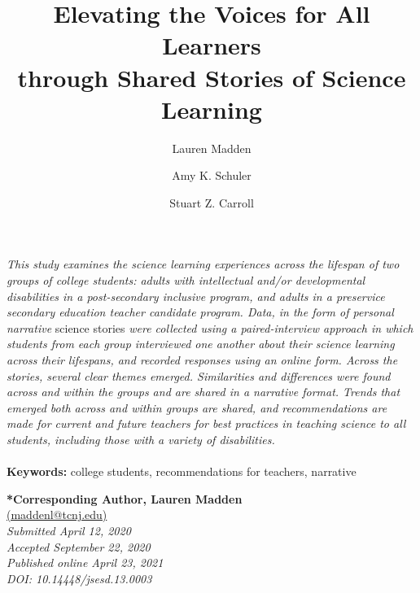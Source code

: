 \documentclass[11pt]{sig-alternate}
\makeatletter
\let\oldabstract\abstract
\let\oldendabstract\endabstract
\renewenvironment{abstract}
{\renewenvironment{quotation}%
               {\list{}{\addtolength{\leftmargin}{1em} %
                        \listparindent 1.5em%
                        \itemindent    \listparindent%
                        \rightmargin   \leftmargin%
                        \parsep        \z@ \@plus\p@}%
                \item\relax}%
               {\endlist}%
\oldabstract}
{\oldendabstract}
\makeatother
\begin{document}
\title{Elevating the Voices for All Learners \\through Shared Stories of Science Learning}

\author[1]{\large \color{blue} Lauren Madden}
\author[1]{\large \color{blue} Amy K. Schuler}
\author[1]{\large \color{blue} Stuart Z. Carroll}


\toappear{}

\maketitle
\begin{@twocolumnfalse} 

\begin{abstract}
\begin{large}
\item 
     \textit{This study examines the science learning experiences across the lifespan of two groups of college students:  adults with intellectual and/or developmental disabilities in a post-secondary inclusive program, and adults in a preservice secondary education teacher candidate program. Data, in the form of personal narrative }science stories\textit{ were collected using a paired-interview approach in which students from each group interviewed one another about their science learning across their lifespans, and recorded responses using an online form. Across the stories, several clear themes emerged.  Similarities and differences were found across and within the groups and are shared in a narrative format. Trends that emerged both across and within groups are shared, and recommendations are made for current and future teachers for best practices in teaching science to all students, including those with a variety of disabilities. }
     \\
     \\
     \textbf{Keywords:} college students, recommendations for teachers, narrative 
     \end{large}
\end{abstract}
\end{@twocolumnfalse}



\textbf{*Corresponding Author, Lauren Madden}\\
\href{mailto:maddenl@tcnj.edu}{(maddenl@tcnj.edu)}\\
\textit{Submitted April 12, 2020}\\
\textit{Accepted September 22, 2020} \\
\textit{Published online April 23, 2021}\\
\textit{DOI: 10.14448/jsesd.13.0003} \\
\end{document}
